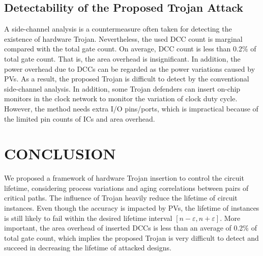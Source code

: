 \subsection{Detectability of the Proposed Trojan Attack}
\label{sec:exp:det}
A side-channel analysis is a countermeasure often taken for detecting the existence of hardware Trojan. Nevertheless, the used DCC count is marginal compared with the total gate count. On average, DCC count is less than 0.2\% of total gate count. That is, the area overhead is insignificant. In addition, the power overhead due to DCCs can be regarded as the power variations caused by PVs. As a result, the proposed Trojan is difficult to detect by the conventional side-channel analysis. In addition, some Trojan defenders can insert on-chip monitors in the clock network to monitor the variation of clock duty cycle. However, the method needs extra I/O pins/ports, which is impractical because of the limited pin counts of ICs and area overhead.


\section{CONCLUSION}
We proposed a framework of hardware Trojan insertion to control the circuit lifetime, considering process variations and aging correlations between pairs of critical paths. The influence of Trojan heavily reduce the lifetime of circuit instances. Even though the accuracy is impacted by PVs, the lifetime of instances is still likely to fail within the desired lifetime interval $[n - \varepsilon, n + \varepsilon]$. More important, the area overhead of inserted DCCs is less than an average of 0.2\% of total gate count, which implies the proposed Trojan is very difficult to detect and succeed in decreasing the lifetime of attacked designs.
